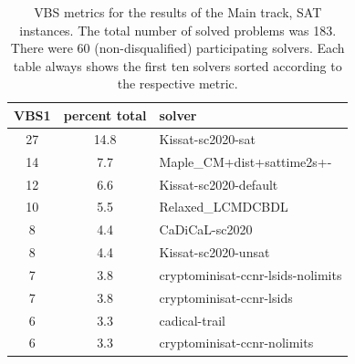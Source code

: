 \documentclass{elsarticle}
\begin{document}
\begin{table}
\caption{VBS metrics for the results of the Main track, SAT instances. 
The total number of solved problems was 183. 
There were 60 (non-disqualified) participating solvers.
Each table always shows the first ten solvers sorted according to the respective metric.}
\label{tab:vbsMainSAT}
\begin{center}
\begin{tabular}{ccl}
VBS1 & percent total & solver \\
\hline
27 & 14.8 & Kissat-sc2020-sat \\
14 & \phantom{0}7.7 & Maple\_CM+dist+sattime2s+- \\
12 & \phantom{0}6.6 & Kissat-sc2020-default \\
10 & \phantom{0}5.5 & Relaxed\_LCMDCBDL \\
\phantom{0}8 & \phantom{0}4.4 & CaDiCaL-sc2020 \\
\phantom{0}8 & \phantom{0}4.4 & Kissat-sc2020-unsat \\
\phantom{0}7 & \phantom{0}3.8 & cryptominisat-ccnr-lsids-nolimits \\
\phantom{0}7 & \phantom{0}3.8 & cryptominisat-ccnr-lsids \\
\phantom{0}6 & \phantom{0}3.3 & cadical-trail \\
\phantom{0}6 & \phantom{0}3.3 & cryptominisat-ccnr-nolimits \\


\end{tabular}
\end{center}
\end{table}
\end{document}
